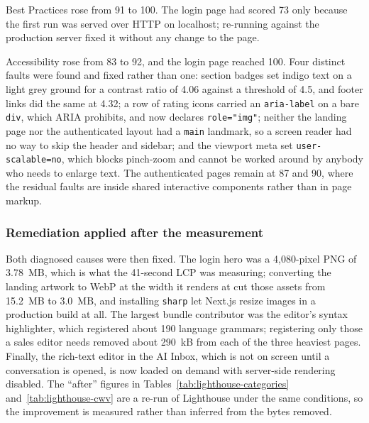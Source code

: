 \documentclass[a4paper]{article}
\begin{document}
Best Practices rose from 91 to 100. The login page had scored 73 only because
the first run was served over HTTP on localhost; re-running against the
production server fixed it without any change to the page.

Accessibility rose from 83 to 92, and the login page reached 100. Four distinct
faults were found and fixed rather than one: section badges set indigo text on
a light grey ground for a contrast ratio of 4.06 against a threshold of 4.5,
and footer links did the same at 4.32; a row of rating icons carried an
\texttt{aria-label} on a bare \texttt{div}, which ARIA prohibits, and now
declares \texttt{role="img"}; neither the landing page nor the authenticated
layout had a \texttt{main} landmark, so a screen reader had no way to skip the
header and sidebar; and the viewport meta set \texttt{user-scalable=no},
which blocks pinch-zoom and cannot be worked around by anybody who needs to
enlarge text. The authenticated pages remain at 87 and 90, where the residual
faults are inside shared interactive components rather than in page markup.

\subsubsection{Remediation applied after the measurement}
Both diagnosed causes were then fixed. The login hero was a 4{,}080-pixel PNG of
3.78~MB, which is what the 41-second LCP was measuring; converting the landing
artwork to WebP at the width it renders at cut those assets from 15.2~MB to
3.0~MB, and installing \texttt{sharp} let Next.js resize images in a production
build at all. The largest bundle contributor was the editor's syntax highlighter,
which registered about 190 language grammars; registering only those a sales
editor needs removed about 290~kB from each of the three heaviest pages. Finally,
the rich-text editor in the AI Inbox, which is not on screen until a conversation
is opened, is now loaded on demand with server-side rendering disabled. The
``after'' figures in Tables~\ref{tab:lighthouse-categories}
and~\ref{tab:lighthouse-cwv} are a re-run of Lighthouse under the same
conditions, so the improvement is measured rather than inferred from the bytes
removed.
\end{document}
